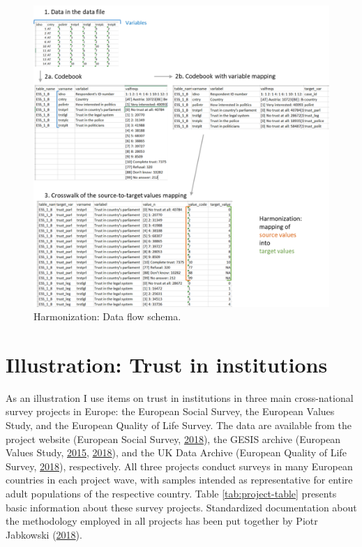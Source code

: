 \documentclass[12pt,]{article}
\begin{document}
\begin{figure}[H]
\includegraphics[width=465px]{../pictures/schema} \caption{Harmonization: Data flow schema.}\label{fig:schema}
\end{figure}

\hypertarget{illustration-trust-in-institutions}{%
\section{Illustration: Trust in institutions}\label{illustration-trust-in-institutions}}

As an illustration I use items on trust in institutions in three main cross-national survey projects in Europe: the European Social Survey, the European Values Study, and the European Quality of Life Survey. The data are available from the project website (European Social Survey, \protect\hyperlink{ref-ESS2018}{2018}), the GESIS archive (European Values Study, \protect\hyperlink{ref-EVS2015}{2015}, \protect\hyperlink{ref-EVS2018}{2018}), and the UK Data Archive (European Quality of Life Survey, \protect\hyperlink{ref-EQLS2018}{2018}), respectively. All three projects conduct surveys in many European countries in each project wave, with samples intended as representative for entire adult populations of the respective country. Table \ref{tab:project-table} presents basic information about these survey projects. Standardized documentation about the methodology employed in all projects has been put together by Piotr Jabkowski (\protect\hyperlink{ref-Jabkowski2018}{2018}).
\end{document}
